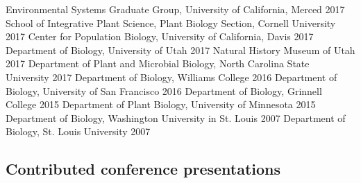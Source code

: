 \documentclass[11pt,english]{article}\usepackage[]{graphicx}\usepackage[]{color}
\begin{document}
Environmental Systems Graduate Group, University of California, Merced \hfill {2017} \newline
School of Integrative Plant Science, Plant Biology Section, Cornell University \hfill {2017} \newline
Center for Population Biology, University of California, Davis \hfill {2017} \newline
Department of Biology, University of Utah \hfill {2017} \newline
Natural History Museum of Utah \hfill {2017} \newline
Department of Plant and Microbial Biology, North Carolina State University \hfill {2017} \newline
Department of Biology, Williams College \hfill {2016} \newline
Department of Biology, University of San Francisco \hfill {2016} \newline
Department of Biology, Grinnell College \hfill {2015} \newline
Department of Plant Biology, University of Minnesota \hfill {2015} \newline
Department of Biology, Washington University in St. Louis \hfill {2007} \newline
Department of Biology, St. Louis University \hfill {2007} \newline
\vspace{-2ex}


\subsection*{Contributed conference presentations} %
\end{document}
